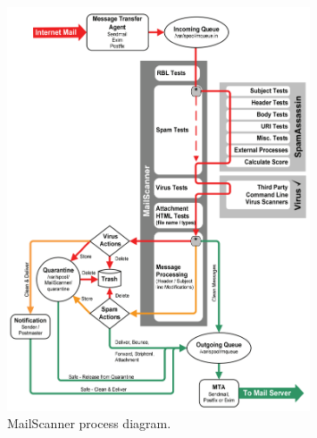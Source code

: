 \begin{figure}[!h]
	\centering
	\includegraphics[width=0.8\textwidth]{Figures/mailscanner.png}
	\caption{MailScanner process diagram.}
	\label{fig:mailscanner}
\end{figure}
